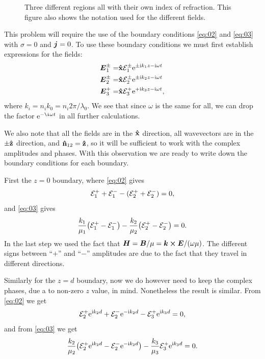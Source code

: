 \documentclass[11pt,letter, swedish, english
]{article}
\begin{document}
\begin{figure}
\centering
\resizebox{.6\textwidth}{!}{}
\caption{Three different regions all with their own index of
  refraction. This figure also shows the notation used for the
  different fields. }
\label{fig:1_geometry}
\end{figure}

This problem will require the use of the boundary conditions
\eqref{eq:02} and \eqref{eq:03} with $\sigma=0$ and $\vb*j=0$. To use
these boundary conditions we must first establish expressions for the
fields:
\begin{equation}
\begin{aligned}
\vb*E_1^\pm=&\vu{x}\mathcal{E}_1^\pm\mathrm{e}^{\pm\mathrm{i} k_1z -\mathrm{i}\omega t}\\
\vb*E_2^\pm=&\vu{x}\mathcal{E}_2^\pm\mathrm{e}^{\pm\mathrm{i} k_2z -\mathrm{i}\omega t}\\
\vb*E_3^{+}=&\vu{x}\mathcal{E}_3^+\mathrm{e}^{+\mathrm{i} k_3z -\mathrm{i}\omega t},
\end{aligned}
\end{equation}
where $k_i=n_ik_0=n_i2\pi/\lambda_0$. We see that since $\omega$
is the same for all, we can drop the factor $\ee^{-\i\omega t}$ in all
further calculations. 

We also note that all the fields are in the $\vu{x}$ direction, all
wavevectors are in the $\pm\vu{z}$ direction, and
$\vu{n}_{12}=\vu{z}$, so it will be sufficient to work with the
complex amplitudes and phases. With this observation we are ready to
write down the boundary conditions for each boundary. 

First the $z=0$ boundary, where \eqref{eq:02} gives
\begin{equation}
{\mathcal{E}_1^+}+{\mathcal{E}_1^-} -({\mathcal{E}_2^+}+{\mathcal{E}_2^-}) =0, 
\end{equation}
and \eqref{eq:03} gives
\begin{equation}
\frac{k_1}{\mu_1}\qty({\mathcal{E}_1^+}-{\mathcal{E}_1^-}) 
-\frac{k_2}{\mu_2}\qty({\mathcal{E}_2^+}-{\mathcal{E}_2^-}) =0.
\end{equation}
In the last step we used the fact that 
$\vb*H = \vb*B/\mu = \vb*k\cross\vb*E/(\omega\mu)$. The different
signs between ``$+$'' and ``$-$'' amplitudes are due to the fact that
they travel in different directions. 

Similarly for the $z=d$ boundary, now we do however need to keep the
complex phases, due a to non-zero $z$ value, in mind. Nonetheless the
result is similar. From \eqref{eq:02} we get
\begin{equation}
{\mathcal{E}_2^+}\mathrm{e}^{\mathrm{i} k_2d}+{\mathcal{E}_2^-}\mathrm{e}^{-\mathrm{i} k_2d} -{\mathcal{E}_3^+}\mathrm{e}^{\mathrm{i} k_3d} =0, 
\end{equation}
and from \eqref{eq:03} we get
\begin{equation}
\frac{k_2}{\mu_2}\qty({\mathcal{E}_2^+}\mathrm{e}^{\mathrm{i} k_2d}-{\mathcal{E}_2^-}\mathrm{e}^{-\mathrm{i} k_2d}) 
-\frac{k_3}{\mu_3}{\mathcal{E}_3^+}\mathrm{e}^{\mathrm{i} k_3d} =0.
\end{equation}
\end{document}
